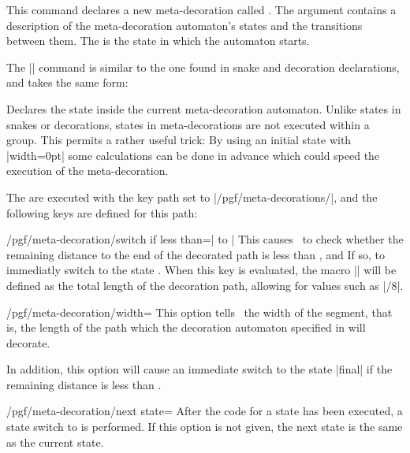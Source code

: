\begin{command}{\pgfdeclaremetadecorate{}}

	This command declares a new meta-decoration called . The
   argument contains a description of the meta-decoration
  automaton's states and the transitions between them. The
   is the state in which the automaton starts.
  
  The |\state| command is similar to the one found in snake and
  decoration declarations, and takes the same form:
  
  \begin{command}{\state{}}
  	Declares the state  inside the current meta-decoration
    automaton.
    Unlike states in snakes or decorations, states in 
	  meta-decorations are not executed within a group. This permits a 
	  rather useful trick: By using an initial state with |width=0pt| some
	  calculations can be done in advance which could speed the execution
	  of the meta-decoration.
    
    The  are executed with the key path set to
    |/pgf/meta-decorations/|, and the following keys are defined for 
    this path: 
    
    \begin{key}{/pgf/meta-decoration/switch if less than=| to |}
      This causes \pgfname\ to check whether the
      remaining distance to the end of the decorated path is less than
      , and If so, to immediatly switch to the state 
      . When this key is evaluated, the macro 
      |\pgfmetadecoratedpathlength| will be defined as the total length of 
      the decoration path, allowing for values such as
      |\pgfmetadecoratedpathlength/8|.
    \end{key}
    
    \begin{key}{/pgf/meta-decoration/width=}
      This option tells \pgfname\ the width of the segment, that is,
      the length of the path which the decoration automaton specified 
      in  will decorate.
      
      In addition, this option will cause an immediate switch to the
      state |final| if the remaining distance is less than
      . 
    \end{key}
    
    \begin{key}{/pgf/meta-decoration/next state=}
      After the code for a state has been executed, a state switch to
       is performed. If this option is not given, the
      next state is the same as the current state.
    \end{key}
    

\end{command}
\end{command}
